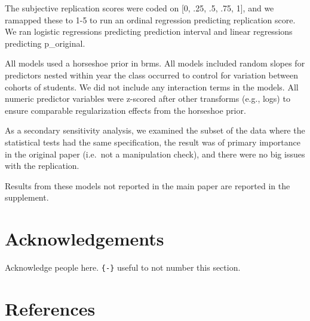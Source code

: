 \documentclass[
  english,
  a4paper,
]{article}
\begin{document}
The subjective replication scores were coded on {[}0, .25, .5, .75, 1{]}, and we ramapped these to 1-5 to run an ordinal regression predicting replication score. We ran logistic regressions predicting prediction interval and linear regressions predicting p\_original.

All models used a horseshoe prior in brms. All models included random slopes for predictors nested within year the class occurred to control for variation between cohorts of students. We did not include any interaction terms in the models. All numeric predictor variables were z-scored after other transforms (e.g., logs) to ensure comparable regularization effects from the horseshoe prior.

As a secondary sensitivity analysis, we examined the subset of the data where the statistical tests had the same specification, the result was of primary importance in the original paper (i.e.~not a manipulation check), and there were no big issues with the replication.

Results from these models not reported in the main paper are reported in the supplement.

\hypertarget{acknowledgements}{%
\section*{Acknowledgements}\label{acknowledgements}}

Acknowledge people here. \texttt{\{-\}} useful to not number this section.

\hypertarget{references}{%
\section*{References}\label{references}}
\end{document}
